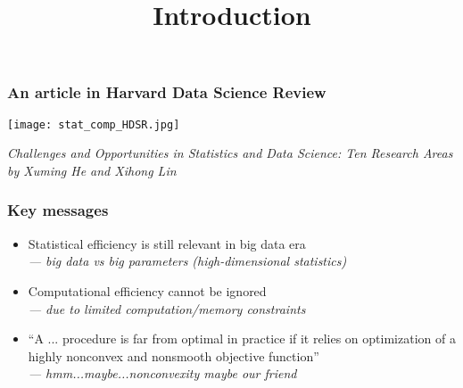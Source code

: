 \documentclass[compress,
mathserif,wide,%
]{beamer}
\title %
{ Introduction}
\begin{document}
\begin{frame}[plain]
  \titlepage

\end{frame}

\begin{frame}
	\frametitle{An article in Harvard Data Science Review}

	\begin{center}
\texttt{[image: stat\_comp\_HDSR.jpg]}

\end{center}	
	{\scriptsize  \em \hfill  Challenges and Opportunities in Statistics and Data Science: Ten Research Areas \\
	\hfill by Xuming He and Xihong Lin}
\end{frame}

\begin{frame}
	\frametitle{Key messages}
	\begin{itemize}
		\item Statistical efficiency is still relevant in big data era \\\pause
			{\hfill \em --- big data vs big parameters (high-dimensional statistics)} \\ \pause
		\item Computational efficiency cannot be ignored  \\ \pause
			{\hfill \em --- due to limited computation/memory constraints} \pause
		\item {\small ``A ... procedure is far from optimal in practice if it relies on optimization  of a highly nonconvex and nonsmooth objective function''} \\ \pause
			{\hfill \em --- hmm...maybe...nonconvexity maybe our friend}
	\end{itemize}
\end{frame}
\end{document}
